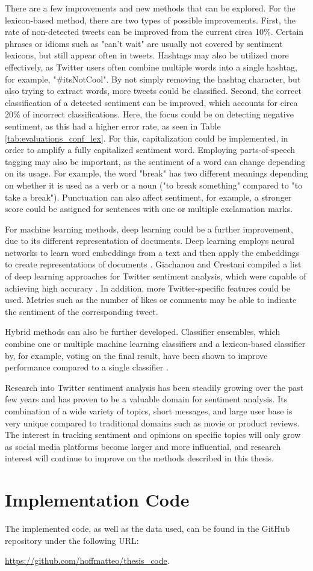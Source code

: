There are a few improvements and new methods that can be explored. For the lexicon-based method, there are two types of possible improvements. First, the rate of non-detected tweets can be improved from the current circa 10\%. Certain phrases or idioms such as "can't wait" are usually not covered by sentiment lexicons, but still appear often in tweets. Hashtags may also be utilized more effectively, as Twitter users often combine multiple words into a single hashtag, for example, "\#itsNotCool". By not simply removing the hashtag character, but also trying to extract words, more tweets could be classified. Second, the correct classification of a detected sentiment can be improved, which accounts for circa 20\% of incorrect classifications. Here, the focus could be on detecting negative sentiment, as this had a higher error rate, as seen in Table \ref{tab:evaluations_conf_lex}. For this, capitalization could be implemented, in order to amplify a fully capitalized sentiment word. Employing parts-of-speech tagging may also be important, as the sentiment of a word can change depending on its usage. For example, the word "break" has two different meanings depending on whether it is used as a verb or a noun ("to break something" compared to "to take a break"). Punctuation can also affect sentiment, for example, a stronger score could be assigned for sentences with one or multiple exclamation marks.

For machine learning methods, deep learning could be a further improvement, due to its different representation of documents. Deep learning employs neural networks to learn word embeddings from a text and then apply the embeddings to create representations of documents \cite{DBLP:journals/csur/GiachanouC16}. Giachanou and Crestani compiled a list of deep learning approaches for Twitter sentiment analysis, which were capable of achieving high accuracy \cite{DBLP:journals/csur/GiachanouC16}. In addition, more Twitter-specific features could be used. Metrics such as the number of likes or comments may be able to indicate the sentiment of the corresponding tweet.

Hybrid methods can also be further developed. Classifier ensembles, which combine one or multiple machine learning classifiers and a lexicon-based classifier by, for example, voting on the final result, have been shown to improve performance compared to a single classifier \cite{DBLP:journals/csur/GiachanouC16}.

Research into Twitter sentiment analysis has been steadily growing over the past few years and has proven to be a valuable domain for sentiment analysis. Its combination of a wide variety of topics, short messages, and large user base is very unique compared to traditional domains such as movie or product reviews. The interest in tracking sentiment and opinions on specific topics will only grow as social media platforms become larger and more influential, and research interest will continue to improve on the methods described in this thesis.

\chapter{Implementation Code}
\label{cha:Chapter8_Code}
The implemented code, as well as the data used, can be found in the GitHub repository under the following URL: 

\url{https://github.com/hoffmatteo/thesis_code}.
